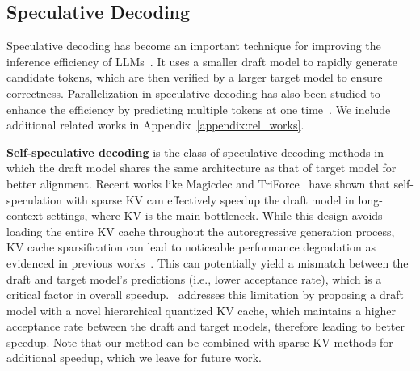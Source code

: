 \subsection{Speculative Decoding}
Speculative decoding has become an important technique for improving the inference efficiency of LLMs~\cite{leviathan2023fast,chen2023accelerating,kim2024speculative}. It uses a smaller draft model to rapidly generate candidate tokens, which are then verified by a larger target model to ensure correctness. Parallelization in speculative decoding has also been studied to enhance the efficiency by predicting multiple tokens at one time~\cite{cai2024medusa,bhendawade2024speculative,li2024eagle,chen2024sequoia}. We include additional related works in Appendix~\ref{appendix:rel_works}.

\textbf{Self-speculative decoding} is the class of speculative decoding methods in which the draft model shares the same architecture as that of target model for better alignment. Recent works like Magicdec \cite{magicdec} and TriForce~\cite{sun2024triforce} have shown that self-speculation with sparse KV can effectively speedup the draft model in long-context settings, where KV is the main bottleneck. While this design avoids loading the entire KV cache throughout the autoregressive generation process, KV cache sparsification can lead to noticeable performance degradation as evidenced in previous works~\cite{zhang2024h2o,liu2024scissorhands,ge2023model,zhou2024sirius}.
This can potentially yield a mismatch between the draft and target model's predictions (i.e., lower acceptance rate), which is a critical factor in overall speedup.
\OURS\ addresses this limitation by proposing a draft model with a novel hierarchical quantized KV cache, which maintains a higher acceptance rate between the draft and target models, therefore leading to better speedup. Note that our method can be combined with sparse KV methods \cite{sun2024triforce, magicdec} for additional speedup, which we leave for future work.